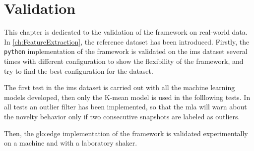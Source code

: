 \chapter{Validation}
\label{sec:Validation}

This chapter is dedicated to the validation of the framework on real-world data. In \autoref{ch:FeatureExtraction}, the reference dataset \cite{lee2007bearingdataset} has been introduced. Firstly, the \texttt{python} implementation of the framework is validated on the \gls{ims} dataset several times with different configuration to show the flexibility of the framework, and try to find the best configuration for the dataset. 

The first test in the \gls{ims} dataset is carried out with all the machine learning models developed, then only the K-mean model is used in the folllowing tests. In all tests an outlier filter has been implemented, so that the \gls{mla} will warn about the novelty behavior only if two consecutive snapshots are labeled as outliers. 

Then, the \gls{glo:edge} implementation of the framework is validated experimentally on a machine and with a laboratory shaker.







